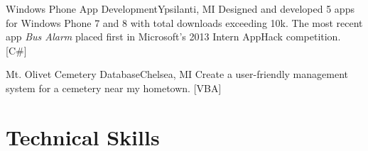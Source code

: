 \documentclass[11pt,letterpaper,sans]{moderncv}
\begin{document}
{Windows Phone App Development}{Ypsilanti, MI}
{}
{Designed and developed 5 apps for Windows Phone 7 and 8 with total downloads exceeding 10k.  The most recent app \emph{Bus Alarm} placed first in Microsoft's 2013 Intern AppHack competition. [C\#]}
\medskip


{Mt. Olivet Cemetery Database}{Chelsea, MI}
{}
{Create a user-friendly management system for a cemetery near my hometown. [VBA]}
\medskip

\section{Technical Skills}
\medskip
{}
\end{document}

